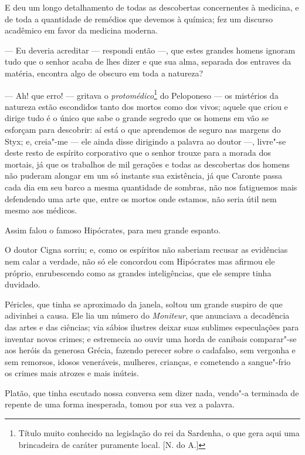 E deu um longo detalhamento de todas as descobertas concernentes à
medicina, e de toda a quantidade de remédios que devemos à química; fez
um discurso acadêmico em favor da medicina moderna.

 --- Eu deveria acreditar --- respondi então ---, que estes grandes
homens ignoram tudo que o senhor acaba de lhes dizer e que sua alma,
separada dos entraves da matéria, encontra algo de obscuro em toda a
natureza?

 --- Ah! que erro! --- gritava o \textit{protomédico}\footnote{ Título
muito conhecido na legislação do rei da Sardenha, o que gera aqui uma
brincadeira de caráter puramente local. [N. do A.]} do Peloponeso --- os
mistérios da natureza estão escondidos tanto dos mortos como dos vivos;
aquele que criou e dirige tudo é o único que sabe o grande segredo que
os homens em vão se esforçam para descobrir: aí está o que aprendemos
de seguro nas margens do Styx; e, creia"-me --- ele ainda disse
dirigindo a palavra ao doutor ---, livre"-se deste resto de espírito
corporativo que o senhor trouxe para a morada dos mortais, já que os
trabalhos de mil gerações e todas as descobertas dos homens não puderam
alongar em um só instante sua existência, já que Caronte passa cada dia
em seu barco a mesma quantidade de sombras, não nos fatiguemos mais
defendendo uma arte que, entre os mortos onde estamos, não seria útil
nem mesmo aos médicos.

 Assim falou o famoso Hipócrates, para meu grande espanto.

 O doutor Cigna sorriu; e, como os espíritos não saberiam recusar as
evidências nem calar a verdade, não só ele concordou com Hipócrates mas
afirmou ele próprio, enrubescendo como as grandes inteligências, que
ele sempre tinha duvidado. 

 Péricles, que tinha se aproximado da janela, soltou um grande suspiro
de que adivinhei a causa. Ele lia um número do \textit{Moniteur}, que       %
anunciava a decadência das artes e das ciências; via sábios ilustres
deixar suas sublimes especulações para inventar novos crimes; e
estremecia ao ouvir uma horda de canibais comparar"-se aos heróis da
generosa Grécia, fazendo perecer sobre o cadafalso, sem vergonha e sem
remorsos, idosos veneráveis, mulheres, crianças, e cometendo a
sangue"-frio os crimes mais atrozes e mais inúteis.

 Platão, que tinha escutado nossa conversa sem dizer nada, vendo"-a
terminada de repente de uma forma inesperada, tomou por sua vez a
palavra.


